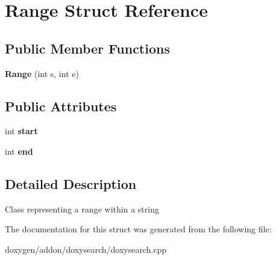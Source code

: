 \hypertarget{struct_range}{}\section{Range Struct Reference}
\label{struct_range}
\subsection*{Public Member Functions}
\begin{DoxyCompactItemize}
\item 
\mbox{\label{struct_range_a2e3223d1373d4eb5240a3c585ef4e425}} 
{\bfseries Range} (int s, int e)
\end{DoxyCompactItemize}
\subsection*{Public Attributes}
\begin{DoxyCompactItemize}
\item 
\mbox{\label{struct_range_afbb98f5d1cbe46d8b49f75322a2f253f}} 
int {\bfseries start}
\item 
\mbox{\label{struct_range_a680587bf22a9bf01b6662c53de90ea97}} 
int {\bfseries end}
\end{DoxyCompactItemize}


\subsection{Detailed Description}
Class representing a range within a string 

The documentation for this struct was generated from the following file\+:\begin{DoxyCompactItemize}
\item 
doxygen/addon/doxysearch/doxysearch.\+cpp\end{DoxyCompactItemize}
